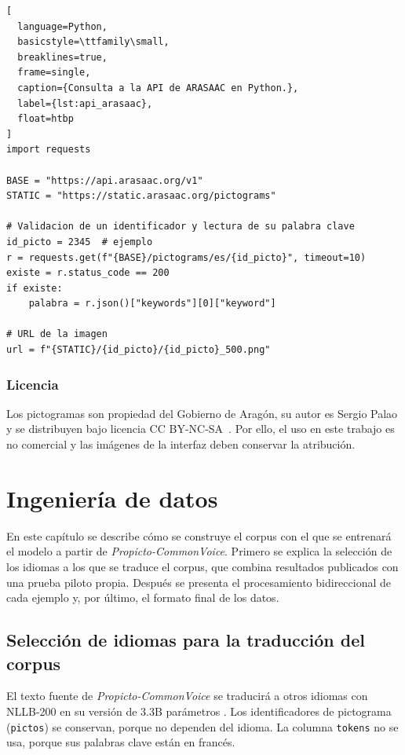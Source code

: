 \begin{lstlisting}[htbp][
  language=Python,
  basicstyle=\ttfamily\small,
  breaklines=true,
  frame=single,
  caption={Consulta a la API de ARASAAC en Python.},
  label={lst:api_arasaac},
  float=htbp
]
import requests

BASE = "https://api.arasaac.org/v1"
STATIC = "https://static.arasaac.org/pictograms"

# Validacion de un identificador y lectura de su palabra clave
id_picto = 2345  # ejemplo
r = requests.get(f"{BASE}/pictograms/es/{id_picto}", timeout=10)
existe = r.status_code == 200
if existe:
    palabra = r.json()["keywords"][0]["keyword"]

# URL de la imagen
url = f"{STATIC}/{id_picto}/{id_picto}_500.png"
\end{lstlisting}
\subsubsection{Licencia}
Los pictogramas son propiedad del Gobierno de Aragón, su autor es Sergio Palao y se distribuyen bajo licencia CC BY-NC-SA~\cite{arasaac}. Por ello, el uso en este trabajo es no comercial y las imágenes de la interfaz deben conservar la atribución.

\clearpage
\section{Ingeniería de datos}
\label{sec:ingenieria-datos}

En este capítulo se describe cómo se construye el corpus con el que se entrenará el modelo a partir de \textit{Propicto-CommonVoice}. Primero se explica la selección de los idiomas a los que se traduce el corpus, que combina resultados publicados con una prueba piloto propia. Después se presenta el procesamiento bidireccional de cada ejemplo y, por último, el formato final de los datos.
 
\subsection{Selección de idiomas para la traducción del corpus}
\label{sec:seleccion_idiomas}
 
El texto fuente de \textit{Propicto-CommonVoice} se traducirá a otros idiomas con NLLB-200 en su versión de 3.3B parámetros \cite{nllbteamNoLanguageLeft2022}. Los identificadores de pictograma (\texttt{pictos}) se conservan, porque no dependen del idioma. La columna \texttt{tokens} no se usa, porque sus palabras clave están en francés.
 
